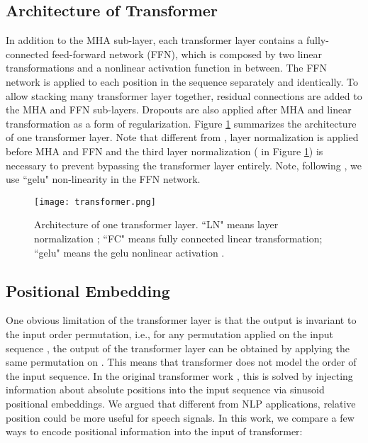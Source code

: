 \documentclass{article}
\begin{document}
\subsection{Architecture of Transformer}
In addition to the MHA sub-layer, each transformer layer contains a fully-connected feed-forward network (FFN), which is composed by two linear transformations and a nonlinear activation function in between.
The FFN network is applied to each position in the sequence separately and identically. To allow stacking many transformer layer together, residual connections are added to the MHA and FFN sub-layers. Dropouts are also applied after MHA and linear transformation as a form of regularization. Figure \ref{fig:transformer_layer} summarizes the architecture of one transformer layer. Note 
that different from \cite{vaswani2017attention}, layer normalization \cite{lei2016layer} is applied before MHA and FFN and the third layer normalization ( in Figure \ref{fig:transformer_layer}) is necessary to prevent bypassing the transformer layer entirely. Note, following \cite{devlin2018bert}, we use ``gelu" non-linearity \cite{hendrycks2016gaussian} in the FFN network.

\begin{figure}[hhh]
    \centering
    \texttt{[image: transformer.png]}
    \caption{Architecture of one transformer layer. ``LN" means layer normalization \cite{lei2016layer}; ``FC" means fully connected linear transformation; ``gelu" means the gelu nonlinear activation \cite{hendrycks2016gaussian}.\vspace{1em}}
    \label{fig:transformer_layer}
\end{figure}


\subsection{Positional Embedding}
One obvious limitation of the transformer layer is that the output is invariant to the input order permutation, i.e., for any permutation  applied on the input sequence , the output of the transformer layer can be obtained by applying the same permutation  on .  This means that transformer does not model the order of the input sequence. In the original transformer work \cite{vaswani2017attention}, this is solved by injecting information about absolute positions into the input sequence via sinusoid positional embeddings. We argued that different from NLP applications, relative position could be more useful for speech signals. In this work, we compare a few ways to encode positional information into the input of transformer: 
\end{document}
